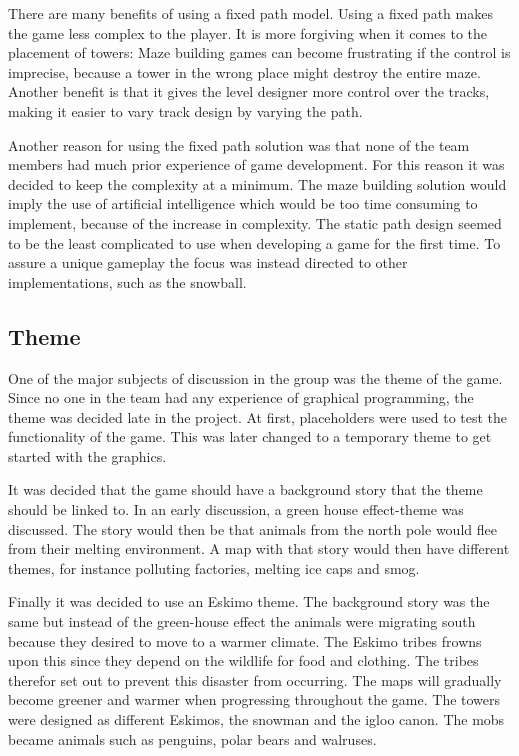 There are many benefits of using a fixed path model. Using a fixed path makes the game less complex to the player. It is more forgiving when it comes to the placement of towers: Maze building games can become frustrating if the control is imprecise, because a tower in the wrong place might destroy the entire maze. Another benefit is that it gives the level designer more control over the tracks, making it easier to vary track design by varying the path.

Another reason for using the fixed path solution was that none of the team members had much prior experience of game development. For this reason it was decided to keep the complexity at a minimum. The maze building solution would imply the use of artificial intelligence which would be too time consuming to implement, because of the increase in complexity. The static path design seemed to be the least complicated to use when developing a game for the first time. To assure a unique gameplay the focus was instead directed to other implementations, such as the snowball.
\subsection{Theme}

One of the major subjects of discussion in the group was the theme of the game. Since no one in the team had any experience of graphical programming, the theme was decided late in the project. At first, placeholders were used to test the functionality of the game. This was later changed to a temporary theme to get started with the graphics. 

It was decided that the game should have a background story that the theme should be linked to. In an early discussion, a green house effect-theme was discussed. The story would then be that animals from the north pole would flee from their melting environment. A map with that story would then have different themes, for instance polluting factories, melting ice caps and smog.

Finally it was decided to use an Eskimo theme. The background story was the same but instead of the green-house effect the animals were migrating south because they desired to move to a warmer climate. The Eskimo tribes frowns upon this since they depend on the wildlife for food and clothing. The tribes therefor set out to prevent this disaster from occurring. The maps will gradually become greener and warmer when progressing throughout the game. The towers were designed as different Eskimos, the snowman and the igloo canon. The mobs became animals such as penguins, polar bears and walruses. 
